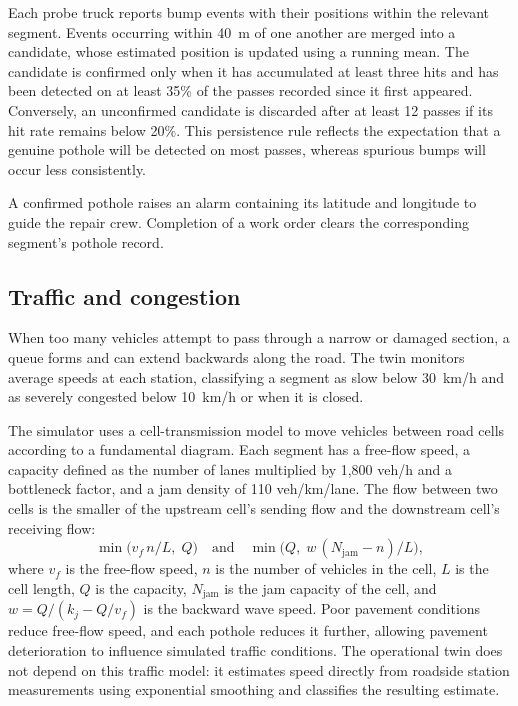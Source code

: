 \documentclass[11pt,a4paper]{article}
\begin{document}
Each probe truck reports bump events with their positions within the relevant segment. Events occurring within 40~m of one another are merged into a candidate, whose estimated position is updated using a running mean. The candidate is confirmed only when it has accumulated at least three hits and has been detected on at least 35\% of the passes recorded since it first appeared. Conversely, an unconfirmed candidate is discarded after at least 12 passes if its hit rate remains below 20\%. This persistence rule reflects the expectation that a genuine pothole will be detected on most passes, whereas spurious bumps will occur less consistently.

A confirmed pothole raises an alarm containing its latitude and longitude to guide the repair crew. Completion of a work order clears the corresponding segment's pothole record.

\subsection{Traffic and congestion}
When too many vehicles attempt to pass through a narrow or damaged section, a queue forms and can extend backwards along the road. The twin monitors average speeds at each station, classifying a segment as slow below 30~km/h and as severely congested below 10~km/h or when it is closed.

The simulator uses a cell-transmission model \cite{daganzo} to move vehicles between road cells according to a fundamental diagram. Each segment has a free-flow speed, a capacity defined as the number of lanes multiplied by 1,800 veh/h and a bottleneck factor, and a jam density of 110 veh/km/lane. The flow between two cells is the smaller of the upstream cell's sending flow and the downstream cell's receiving flow:
\[
\min\big(v_f\,n/L,\;Q\big)\quad\text{and}\quad \min\big(Q,\;w\,(N_{\mathrm{jam}}-n)/L\big),
\]
where $v_f$ is the free-flow speed, $n$ is the number of vehicles in the cell, $L$ is the cell length, $Q$ is the capacity, $N_{\mathrm{jam}}$ is the jam capacity of the cell, and $w=Q/(k_j-Q/v_f)$ is the backward wave speed. Poor pavement conditions reduce free-flow speed, and each pothole reduces it further, allowing pavement deterioration to influence simulated traffic conditions. The operational twin does not depend on this traffic model: it estimates speed directly from roadside station measurements using exponential smoothing and classifies the resulting estimate.
\end{document}
